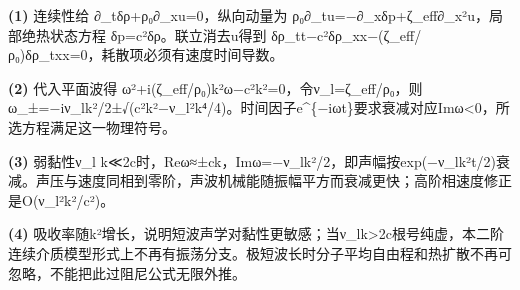 \par\noindent\textbf{(1)} 连续性给 ∂\_tδρ+ρ₀∂\_xu=0，纵向动量为 ρ₀∂\_tu=−∂\_xδp+ζ\_eff∂\_x²u，局部绝热状态方程 δp=c²δρ。联立消去u得到 δρ\_tt−c²δρ\_xx−(ζ\_eff/ρ₀)δρ\_txx=0，耗散项必须有速度时间导数。
\par\noindent\textbf{(2)} 代入平面波得 ω²+i(ζ\_eff/ρ₀)k²ω−c²k²=0，令ν\_l=ζ\_eff/ρ₀，则 ω\_±=−iν\_lk²/2±√(c²k²−ν\_l²k⁴/4)。时间因子e\textasciicircum{}\{−iωt\}要求衰减对应Imω<0，所选方程满足这一物理符号。
\par\noindent\textbf{(3)} 弱黏性ν\_l k≪2c时，Reω≈±ck，Imω=−ν\_lk²/2，即声幅按exp(−ν\_lk²t/2)衰减。声压与速度同相到零阶，声波机械能随振幅平方而衰减更快；高阶相速度修正是O(ν\_l²k²/c²)。
\par\noindent\textbf{(4)} 吸收率随k²增长，说明短波声学对黏性更敏感；当ν\_lk>2c根号纯虚，本二阶连续介质模型形式上不再有振荡分支。极短波长时分子平均自由程和热扩散不再可忽略，不能把此过阻尼公式无限外推。

